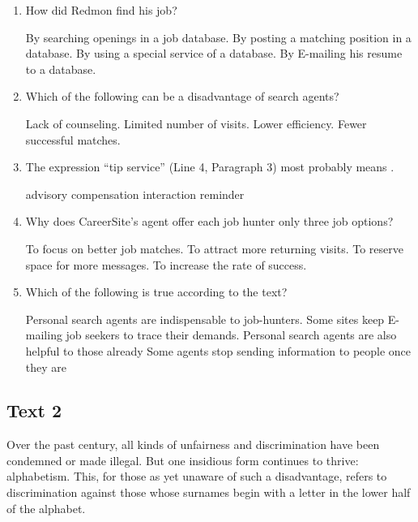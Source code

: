 \begin{enumerate}[resume]
	\item
How did Redmon find his job?


\fourchoices
{By searching openings in a job database.}
{By posting a matching position in a database.}
{By using a special service of a database.}
{By E-mailing his resume to a database.}


\item
Which of the following can be a disadvantage of search agents?


\fourchoices
{Lack of counseling.}
{Limited number of visits.}
{Lower efficiency.}
{Fewer successful matches.}


\item
The expression ``tip service'' (Line 4, Paragraph 3) most probably
means \lineread.


\fourchoices
{advisory}
{compensation}
{interaction}
{reminder}


\item
Why does CareerSite's agent offer each job hunter only three job
options?


\fourchoices
{To focus on better job matches.}
{To attract more returning visits.}
{To reserve space for more messages.}
{To increase the rate of success.}


\item
Which of the following is true according to the text?

\fourchoices
{Personal search agents are indispensable to job-hunters.}
{Some sites keep E-mailing job seekers to trace their demands.}
{Personal search agents are also helpful to those already}
{Some agents stop sending information to people once they are}


\end{enumerate}

	
\newpage
\subsection{Text 2}
	


Over the past century, all kinds of unfairness and discrimination have
been condemned or made illegal. But one insidious form continues to
thrive: alphabetism. This, for those as yet unaware of such a
disadvantage, refers to discrimination against those whose surnames
begin with a letter in the lower half of the alphabet.


